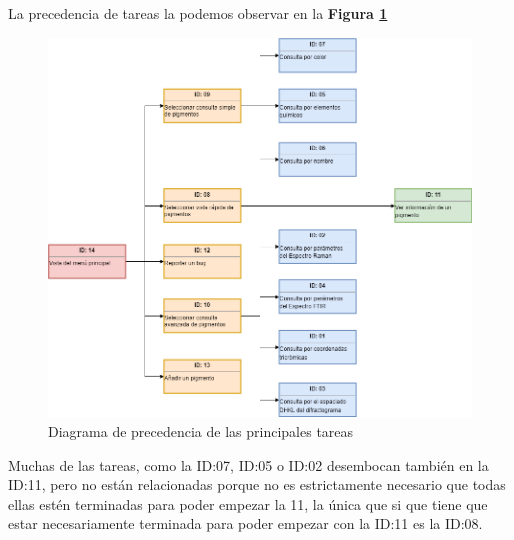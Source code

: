 La precedencia de tareas la podemos observar en la \textbf{Figura \ref{fig:precedenciaTareas}}

\begin{figure}[H]
    \centering
    \includegraphics[scale=0.5]{imagenes/diseno/precedenciasTareas.png}
    \caption{Diagrama de precedencia de las principales tareas}
    \label{fig:precedenciaTareas}
\end{figure}

Muchas de las tareas, como la ID:07, ID:05 o ID:02 desembocan también en la ID:11, pero no están relacionadas porque no es estrictamente necesario que todas ellas estén terminadas para poder empezar la 11, la única que si que tiene que estar necesariamente terminada para poder empezar con la ID:11 es la ID:08. 

